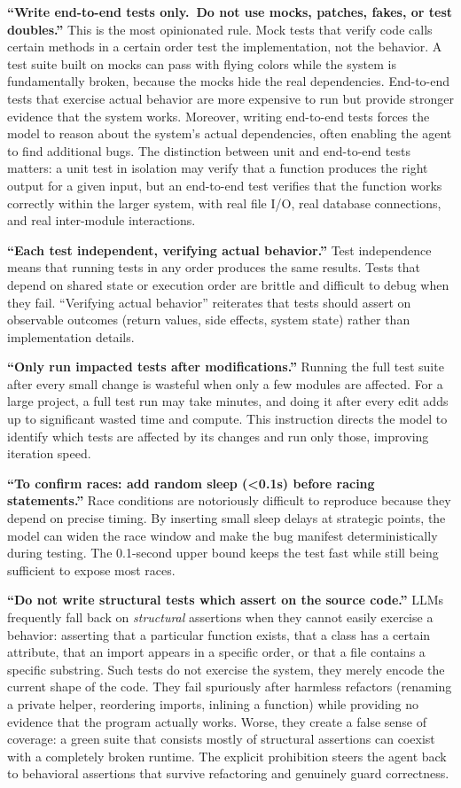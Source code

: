 \documentclass{article}
\begin{document}
\textbf{``Write end-to-end tests only.\ Do not use mocks, patches, fakes, or test doubles.''}  This is the most opinionated rule.  Mock tests that verify code calls certain methods in a certain order test the implementation, not the behavior.  A test suite built on mocks can pass with flying colors while the system is fundamentally broken, because the mocks hide the real dependencies.  End-to-end tests that exercise actual behavior are more expensive to run but provide stronger evidence that the system works.  Moreover, writing end-to-end tests forces the model to reason about the system's actual dependencies, often enabling the agent to find additional bugs.  The distinction between unit and end-to-end tests matters: a unit test in isolation may verify that a function produces the right output for a given input, but an end-to-end test verifies that the function works correctly within the larger system, with real file I/O, real database connections, and real inter-module interactions.

\textbf{``Each test independent, verifying actual behavior.''}  Test independence means that running tests in any order produces the same results.  Tests that depend on shared state or execution order are brittle and difficult to debug when they fail.  ``Verifying actual behavior'' reiterates that tests should assert on observable outcomes (return values, side effects, system state) rather than implementation details.

\textbf{``Only run impacted tests after modifications.''}  Running the full test suite after every small change is wasteful when only a few modules are affected.  For a large project, a full test run may take minutes, and doing it after every edit adds up to significant wasted time and compute.  This instruction directs the model to identify which tests are affected by its changes and run only those, improving iteration speed.

\textbf{``To confirm races: add random sleep (<0.1s) before racing statements.''}  Race conditions are notoriously difficult to reproduce because they depend on precise timing.  By inserting small sleep delays at strategic points, the model can widen the race window and make the bug manifest deterministically during testing.  The 0.1-second upper bound keeps the test fast while still being sufficient to expose most races.

\textbf{``Do not write structural tests which assert on the source code.''}  LLMs frequently fall back on \emph{structural} assertions when they cannot easily exercise a behavior: asserting that a particular function exists, that a class has a certain attribute, that an import appears in a specific order, or that a file contains a specific substring.  Such tests do not exercise the system, they merely encode the current shape of the code.  They fail spuriously after harmless refactors (renaming a private helper, reordering imports, inlining a function) while providing no evidence that the program actually works.  Worse, they create a false sense of coverage: a green suite that consists mostly of structural assertions can coexist with a completely broken runtime.  The explicit prohibition steers the agent back to behavioral assertions that survive refactoring and genuinely guard correctness.
\end{document}
